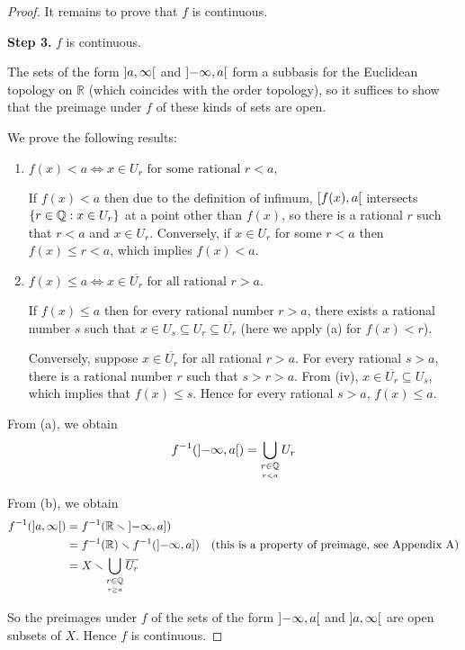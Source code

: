 \begin{proof}
	It remains to prove that $f$ is continuous.

	\textbf{Step 3.} $f$ is continuous.

	The sets of the form $\left]{a, \infty}\right[$ and $\left]{-\infty, a}\right[$ form a subbasis for the Euclidean topology on $\mathbb{R}$ (which coincides with the order topology), so it suffices to show that the preimage under $f$ of these kinds of sets are open.

	We prove the following results:
	\begin{enumerate}[label={(\alph*)}]
		\item $f(x) < a \Longleftrightarrow \text{$x\in U_{r}$ for some rational $r < a$,}$

		      If $f(x) < a$ then due to the definition of infimum, $\left[{f(x), a}\right[$ intersects $\left\{{ r\in\mathbb{Q} : x\in U_{r} }\right\}$ at a point other than $f(x)$, so there is a rational $r$ such that $r < a$ and $x\in U_{r}$. Conversely, if $x\in U_{r}$ for some $r < a$ then $f(x) \leq r < a$, which implies $f(x) < a$.
		\item $f(x) \leq a \Longleftrightarrow \text{$x\in \overline{U_{r}}$ for all rational $r > a$.}$

		      If $f(x) \leq a$ then for every rational number $r > a$, there exists a rational number $s$ such that $x\in U_{s} \subseteq U_{r} \subseteq \overline{U_{r}}$ (here we apply (a) for $f(x) < r$).

		      Conversely, suppose $x\in \overline{U_{r}}$ for all rational $r > a$. For every rational $s > a$, there is a rational number $r$ such that $s > r > a$. From (iv), $x\in \overline{U_{r}} \subseteq U_{s}$, which implies that $f(x) \leq s$. Hence for every rational $s > a$, $f(x) \leq a$.
	\end{enumerate}

	From (a), we obtain
	\[
		f^{-1}(\left]{-\infty, a}\right[) = \bigcup_{\underset{r < a}{r\in\mathbb{Q}}}U_{r}
	\]

	From (b), we obtain
	\begin{align*}
		f^{-1}(\left]{a, \infty}\right[) & = f^{-1}(\mathbb{R}\smallsetminus \left]{-\infty, a}\right])                                                                               \\
		                                 & = f^{-1}(\mathbb{R}) \smallsetminus f^{-1}(\left]{-\infty, a}\right])            & \text{(this is a property of preimage, see Appendix A)} \\
		                                 & = X \smallsetminus \bigcup_{\underset{r \geq a}{r\in\mathbb{Q}}}\overline{U_{r}}
	\end{align*}

	So the preimages under $f$ of the sets of the form $\left]{-\infty, a}\right[$ and $\left]{a, \infty}\right[$ are open subsets of $X$. Hence $f$ is continuous.
\end{proof}

